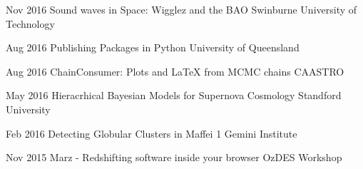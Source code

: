 \begin{entrylist}
	\entryInlineSmall
	{Nov 2016}
	{Sound waves in Space: Wigglez and the BAO}
	{Swinburne University of Technology}
	{}
\end{entrylist}
\begin{entrylist}
	\entryInlineSmall
	{Aug 2016}
	{Publishing Packages in Python}
	{University of Queensland}
	{}
\end{entrylist}
\begin{entrylist}
	\entryInlineSmall
	{Aug 2016}
	{ChainConsumer: Plots and LaTeX from MCMC chains}
	{CAASTRO}
	{}
\end{entrylist}
\begin{entrylist}
	\entryInlineSmall
	{May 2016}
	{Hieracrhical Bayesian Models for Supernova Cosmology}
	{Standford University}
	{}
\end{entrylist}
\begin{entrylist}
	\entryInlineSmall
	{Feb 2016}
	{Detecting Globular Clusters in Maffei 1}
	{Gemini Institute}
	{}
\end{entrylist}
\begin{entrylist}
	\entryInlineSmall
	{Nov 2015}
	{Marz - Redshifting software inside your browser}
	{OzDES Workshop}
	{}
\end{entrylist}


